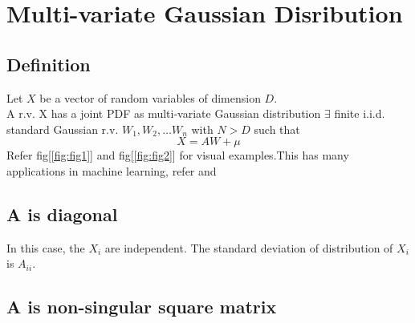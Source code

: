 \documentclass{article}
\begin{document}
\section{Multi-variate Gaussian Disribution}
\subsection{Definition}
Let $X$ be a vector of random variables of dimension $D$.\\
A r.v. X has a joint PDF as multi-variate Gaussian distribution $\exists$ finite i.i.d. standard Gaussian r.v. $W_1, W_2,\dots W_n$ with $N>D$ such that
\[
X = AW + \mu
\]
Refer fig[\ref{fig:fig1}] and fig[\ref{fig:fig2}] for visual examples.This has many applications in machine learning, refer \cite{ref3} and \cite{ref2}

\subsection{A is diagonal}
In this case, the $X_i$ are independent. The standard deviation of distribution of $X_i$ is $A_{ii}$.
\subsection{A is non-singular square matrix}
\end{document}
